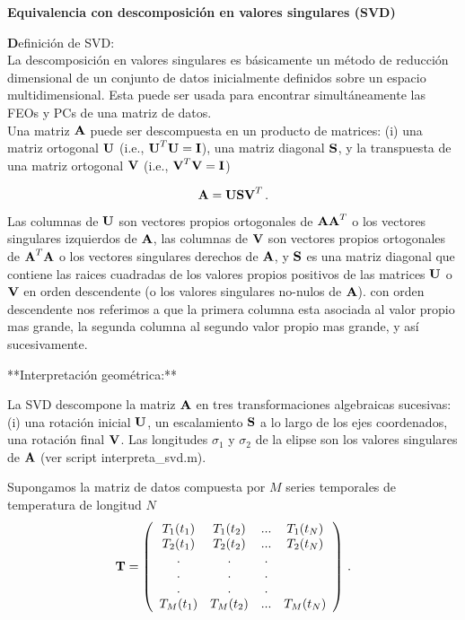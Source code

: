 \documentclass[
]{agujournal2019}
\begin{document}
\textbf{Equivalencia con descomposición en valores singulares (SVD)}

\begin{framed}
{ \textbf Definición de SVD:}
\\
La descomposición en valores singulares es básicamente un método de
reducción dimensional de un conjunto de datos inicialmente definidos sobre
un espacio multidimensional. Esta puede ser usada para encontrar simultáneamente
las FEOs y PCs de una matriz de datos.
\\

Una matriz ${\textbf A}$ puede ser descompuesta en un producto de
matrices: (i) una matriz ortogonal ${\textbf U}$ (i.e., ${\textbf U}^T{\textbf U}={\textbf I}$), una matriz
diagonal ${\textbf S}$, y la transpuesta de una matriz ortogonal
${\textbf V}$ (i.e., ${\textbf V}^T{\textbf V}={\textbf I}$)

$$
{\textbf A}={\textbf U}{\textbf S}{\textbf V}^T\,.$$

Las columnas de ${\textbf U}$ son vectores propios ortogonales de
${\textbf A}{\textbf A}^T$ o los vectores singulares izquierdos de ${\textbf A}$,
las columnas de ${\textbf V}$ son vectores propios ortogonales de
${\textbf A}^T{\textbf A}$ o los vectores singulares derechos de ${\textbf A}$,
y ${\textbf S}$ es una matriz diagonal que contiene las raices cuadradas
de los valores propios positivos de las matrices  ${\textbf U}$ o ${\textbf V}$
en orden descendente (o los valores singulares no-nulos de ${\textbf A}$). con orden
descendente nos referimos a que la primera
columna esta asociada al valor propio mas grande, la segunda columna al
segundo valor propio mas grande, y así sucesivamente.
\

**Interpretación geométrica:**

La SVD descompone la matriz ${\textbf A}$ en tres transformaciones
algebraicas sucesivas: (i) una rotación inicial ${\textbf U}$, un escalamiento ${\textbf S}$ a lo largo de los ejes coordenados, una
rotación final ${\textbf V}$. Las longitudes $\sigma_1$ y $\sigma_2$ de
la elipse son los valores singulares de ${\textbf A}$ (ver script interpreta\_svd.m).

\end{framed}

Supongamos la matriz de datos compuesta por \(M\) series temporales de
temperatura de longitud \(N\) \[{\textbf T}=\left(\begin{array}{cccc}
   T_{1}(t_1) & T_{1}(t_2) & ... & T_{1}(t_N)\\
   T_{2}(t_1) & T_{2}(t_2) & ... & T_{2}(t_N)\\
                . & . & . \\
        . & . & . \\
        . & . & . \\
   T_{M}(t_1) & T_{M}(t_2) & ... & T_{M}(t_N)\\
        \end{array}\right)\,.\]
\end{document}

